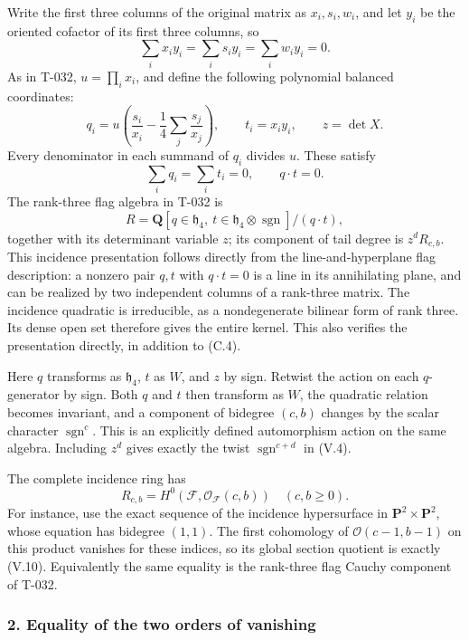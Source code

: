 \documentclass[
  10pt,
]{article}
\begin{document}
Write the first three columns of the original matrix as \(x_i,s_i,w_i\),
and let \(y_i\) be the oriented cofactor of its first three columns, so
\[
\sum_i x_i y_i=\sum_i s_i y_i=\sum_i w_i y_i=0.
\] As in T-032, \(u=\prod_i x_i\), and define the following polynomial
balanced coordinates: \[
q_i=u\left(\frac{s_i}{x_i}
-\frac14\sum_j\frac{s_j}{x_j}\right),\qquad
t_i=x_i y_i,\qquad z=\det X.
\tag{V.8}
\] Every denominator in each summand of \(q_i\) divides \(u\). These
satisfy \[
\sum_i q_i=\sum_i t_i=0,\qquad q\cdot t=0.
\tag{V.9}
\] The rank-three flag algebra in T-032 is \[
R=\mathbf Q[q\in\mathfrak h_4,\ t\in\mathfrak h_4\otimes\operatorname{sgn}]
/(q\cdot t),
\tag{V.10}
\] together with its determinant variable \(z\); its component of tail
degree is \(z^dR_{c,b}\). This incidence presentation follows directly
from the line-and-hyperplane flag description: a nonzero pair \(q,t\)
with \(q\cdot t=0\) is a line in its annihilating plane, and can be
realized by two independent columns of a rank-three matrix. The
incidence quadratic is irreducible, as a nondegenerate bilinear form of
rank three. Its dense open set therefore gives the entire kernel. This
also verifies the presentation directly, in addition to (C.4).

Here \(q\) transforms as \(\mathfrak h_4\), \(t\) as \(W\), and \(z\) by
sign. Retwist the action on each \(q\)-generator by sign. Both \(q\) and
\(t\) then transform as \(W\), the quadratic relation becomes invariant,
and a component of bidegree \((c,b)\) changes by the scalar character
\(\operatorname{sgn}^c\). This is an explicitly defined automorphism
action on the same algebra. Including \(z^d\) gives exactly the twist
\(\operatorname{sgn}^{c+d}\) in (V.4).

The complete incidence ring has \[
R_{c,b}=H^0(\mathcal F,\mathcal O_{\mathcal F}(c,b))
\quad(c,b\ge0).
\tag{V.11}
\] For instance, use the exact sequence of the incidence hypersurface in
\(\mathbf P^2\times\mathbf P^2\), whose equation has bidegree \((1,1)\).
The first cohomology of \(\mathcal O(c-1,b-1)\) on this product vanishes
for these indices, so its global section quotient is exactly (V.10).
Equivalently the same equality is the rank-three flag Cauchy component
of T-032.

\subsubsection{2. Equality of the two orders of
vanishing}\label{equality-of-the-two-orders-of-vanishing}
\end{document}
